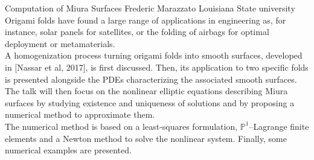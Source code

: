 \begin{addmargin}[2em]{0em}
\vspace{1.5ex}
\abs
{Computation of Miura Surfaces}
{Frederic Marazzato}
{Louisiana State university}
{Origami folds have found a large range of applications in engineering as, for instance, solar panels for satellites, or the folding of airbags for optimal deployment or metamaterials.\\
A homogenization process turning origami folds into smooth surfaces, developed in [Nassar et al, 2017], is first discussed. Then, its application to two specific folds is presented alongside the PDEs characterizing the associated smooth surfaces. The talk will then focus on the nonlinear elliptic equations describing Miura surfaces by studying existence and uniqueness of solutions and by proposing a numerical method to approximate them. \\The numerical method is based on a least-squares formulation, $\mathbb{P}^1$--Lagrange finite elements and a Newton method to solve the nonlinear system.
Finally, some numerical examples are presented.}
\end{addmargin}

